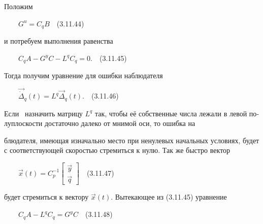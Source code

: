 \documentclass[a4paper]{article}
\begin{document}
{\begin{russian}\sffamily
Положим
\end{russian}}

{\begin{russian}\sffamily
\ \ \ \  $G^u=C_qB$\ \ (3.11.44)
\end{russian}}

{\begin{russian}\sffamily
и потребуем выполнения равенства
\end{russian}}

{\begin{russian}\sffamily
\ \ \ \  $C_qA-G^yC-L^qC_q=0$.\ \ (3.11.45)
\end{russian}}

{\begin{russian}\sffamily
Тогда получим уравнение для ошибки наблюдателя
\end{russian}}

{\begin{russian}\sffamily
\ \ \ \  $\vec{\dot Δ}_q(t)=L^q\vec Δ_q(t)$.\ \ (3.11.46)
\end{russian}}

{\begin{russian}\sffamily
Если \ назначить матрицу  $L^q$ так, чтобы её собственные числа лежали в левой полуплоскости достаточно далеко от мнимой
оси, то ошибка на
\end{russian}}

{\begin{russian}\sffamily
блюдателя, имеющая изначально место при ненулевых начальных условиях, будет с соответствующей скоростью стремиться к
нулю. Так же быстро вектор
\end{russian}}

{\begin{russian}\sffamily
\ \ \ \  $\vec x(t)=C_p^{-1}\left[\begin{matrix}\vec y\\\vec q\end{matrix}\right]$\ \ (3.11.47)
\end{russian}}

{\begin{russian}\sffamily
будет стремиться к вектору  $\vec x(t)$. Вытекающее из (3.11.45) уравнение
\end{russian}}

{\begin{russian}\sffamily
\ \ \ \  $C_qA-L^qC_q=G^yC$\ \ (3.11.48)
\end{russian}}
\end{document}
